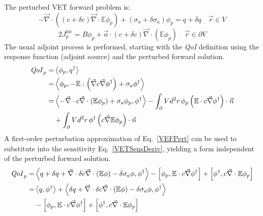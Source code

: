 \documentclass{article}
\newcommand{\vr}{\vec{r}}
\newcommand{\bra}{\left\langle}
\newcommand{\ket}{\right\rangle}
\newcommand{\sbra}{\left[}
\newcommand{\sket}{\right]}
\renewcommand{\div}{\vec{\nabla} \cdot}
\newcommand{\grad}{\vec{\nabla}}
\newcommand{\domain}{V}
\newcommand{\bound}{\partial V}
\newcommand{\vn}{\vec{n}}
\newcommand{\Edd}{\mathbb{E}}
\newcommand{\siga}{\sigma_a}
\newcommand{\isigt}{c}
\newcommand{\scalSource}{q}
\newcommand{\scalResp}{q^\dag}
\newcommand{\qoi}{{\it QoI}\xspace}
\begin{document}
The perturbed VET forward problem is:
\begin{subequations}
\begin{equation}
\label{VEFPert}
- \div \left((\isigt + \delta \isigt)\div \Edd \phi_p \right) + (\siga + \delta \siga)\phi_p = \scalSource + \delta \scalSource  \quad \vr \in \domain
\end{equation}
\end{subequations}
\begin{subequations}
\begin{equation}
 2J_p^\text{inc} = B \phi_p  + \vn \cdot  (\isigt + \delta \isigt) \vec{\nabla} \cdot \left(\Edd \phi_p \right)  \quad \vr \in \bound
\end{equation}
\end{subequations}
The usual adjoint process is performed, starting with the \qoi definition using the response function (adjoint source) and the perturbed forward solution. 
\begin{equation}
\label{VETSensDeriv}
\begin{split}
\qoi_p = &\bra \phi_p , \scalResp \ket \\
       = &\bra \phi_p , - \Edd : \left( \grad \isigt \grad \phi^\dag \right) + \siga \phi^\dag \ket \\
       = & \bra - \div \isigt \div \left( \Edd \phi_p \right) + \siga \phi_p, \phi^\dag \ket 
 - \int_\bound d^2 r \, \phi_p \left( \Edd \cdot \isigt \grad \phi^\dag \right) \cdot \vec{n}  \\ 
&+ \int_\bound d^2 r \, \phi^\dag \left(  \isigt \grad \Edd \phi_p \right) \cdot \vec{n} \\
\end{split}
\end{equation}
A first-order perturbation approximation of Eq.~\eqref{VEFPert} can be used to substitute into the sensitivity Eq.~\eqref{VETSensDeriv}, yielding a form independent of the perturbed forward solution.
\begin{equation}
\label{QoIVETAdjNoBC}
\begin{split}
\qoi_p =& \bra \scalSource + \delta \scalSource + \div \delta \isigt \div \left( \Edd \phi \right) - \delta \siga \phi, \phi^\dag \ket - \sbra \phi_p, \Edd \cdot \isigt \grad \phi^\dag \sket + \sbra \phi^\dag, \isigt \div \Edd \phi_p \sket \\
=& \bra q, \phi^\dag \ket  + \bra \delta \scalSource + \div \delta \isigt \div \left( \Edd \phi \right)  - \delta \siga \phi, \phi^\dag \ket \\
& - \sbra \phi_p, \Edd \cdot \isigt \grad \phi^\dag \sket + \sbra \phi^\dag, \isigt \div \Edd \phi_p \sket 
\end{split}
\end{equation}
\end{document}
